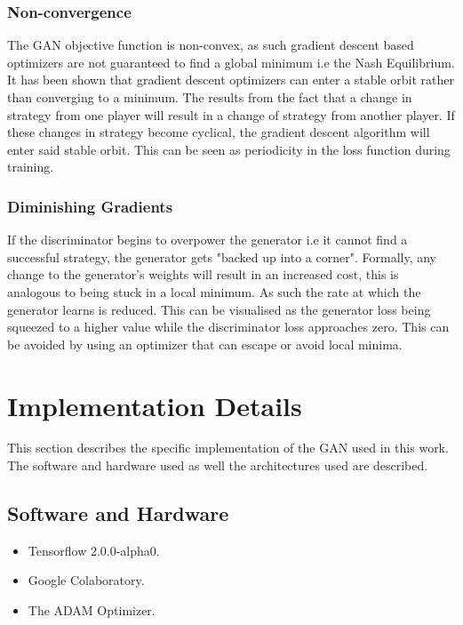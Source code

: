 \documentclass[conference]{IEEEtran}
\begin{document}
\subsubsection{Non-convergence}

The GAN objective function is non-convex, as such gradient descent based optimizers are not guaranteed to find a global minimum i.e the Nash Equilibrium. It has been shown that gradient descent optimizers can enter a stable orbit rather than converging to a minimum\cite{salimans2016improved}. The results from the fact that a change in strategy from one player will result in a change of strategy from another player. If these changes in strategy become cyclical, the gradient descent algorithm will enter said stable orbit. This can be seen as periodicity in the loss function during training.\\

\subsubsection{Diminishing Gradients}

If the discriminator begins to overpower the generator i.e it cannot find a successful strategy, the generator gets "backed up into a corner". Formally, any change to the generator's weights will result in an increased cost, this is analogous to being stuck in a local minimum. As such the rate at which the generator learns is reduced. This can be visualised as the generator loss being squeezed to a higher value while the discriminator loss approaches zero. This can be avoided by using an optimizer that can escape or avoid local minima. \\

\section{Implementation Details}

This section describes the specific implementation of the GAN used in this work. The software and hardware used as well the architectures used are described.

\subsection{Software and Hardware}

\begin{itemize}
    \item Tensorflow 2.0.0-alpha0.
    \item Google Colaboratory.
    \item The ADAM Optimizer.
\end{itemize}
\end{document}
